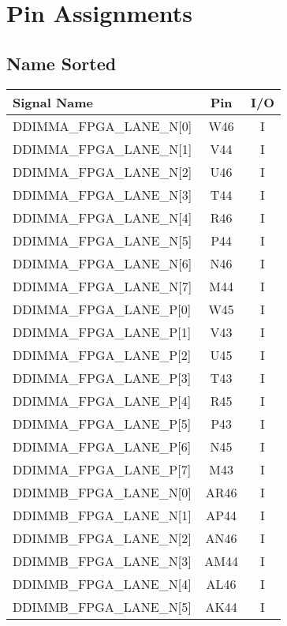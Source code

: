 \section{Pin Assignments} \label{section_pins}

\subsection{Name Sorted}
\begin{longtable}[l]{| l | c | c |}
  \hline
  Signal Name                  & Pin  & I/O \\ \hline
  \endhead
  DDIMMA\_FPGA\_LANE\_N[0]     & W46  & I   \\ \hline
  DDIMMA\_FPGA\_LANE\_N[1]     & V44  & I   \\ \hline
  DDIMMA\_FPGA\_LANE\_N[2]     & U46  & I   \\ \hline
  DDIMMA\_FPGA\_LANE\_N[3]     & T44  & I   \\ \hline
  DDIMMA\_FPGA\_LANE\_N[4]     & R46  & I   \\ \hline
  DDIMMA\_FPGA\_LANE\_N[5]     & P44  & I   \\ \hline
  DDIMMA\_FPGA\_LANE\_N[6]     & N46  & I   \\ \hline
  DDIMMA\_FPGA\_LANE\_N[7]     & M44  & I   \\ \hline
  DDIMMA\_FPGA\_LANE\_P[0]     & W45  & I   \\ \hline
  DDIMMA\_FPGA\_LANE\_P[1]     & V43  & I   \\ \hline
  DDIMMA\_FPGA\_LANE\_P[2]     & U45  & I   \\ \hline
  DDIMMA\_FPGA\_LANE\_P[3]     & T43  & I   \\ \hline
  DDIMMA\_FPGA\_LANE\_P[4]     & R45  & I   \\ \hline
  DDIMMA\_FPGA\_LANE\_P[5]     & P43  & I   \\ \hline
  DDIMMA\_FPGA\_LANE\_P[6]     & N45  & I   \\ \hline
  DDIMMA\_FPGA\_LANE\_P[7]     & M43  & I   \\ \hline
  DDIMMB\_FPGA\_LANE\_N[0]     & AR46 & I   \\ \hline
  DDIMMB\_FPGA\_LANE\_N[1]     & AP44 & I   \\ \hline
  DDIMMB\_FPGA\_LANE\_N[2]     & AN46 & I   \\ \hline
  DDIMMB\_FPGA\_LANE\_N[3]     & AM44 & I   \\ \hline
  DDIMMB\_FPGA\_LANE\_N[4]     & AL46 & I   \\ \hline
  DDIMMB\_FPGA\_LANE\_N[5]     & AK44 & I   \\ \hline

\end{longtable}
